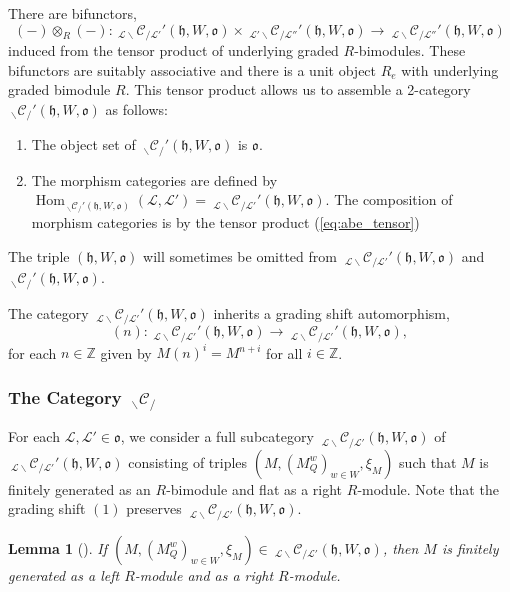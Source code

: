 \documentclass{amsart}
\newcommand{\Z}{\mathbb{Z}}
\newcommand{\scrL}{\mathcal{L}}
\DeclareMathOperator{\Hom}{Hom}
\newcommand{\fr}[1]{\mathfrak{#1}}
\newcommand{\Cmon}[2]{\:_{#1 \backslash} \mathcal{C}_{/ #2} }
\newtheorem{lemma}[subsubsection]{Lemma}
\theoremstyle{definition}
\numberwithin{equation}{subsection}
\begin{document}
There are bifunctors,
\begin{equation}\label{eq:abe_tensor}
    (-) \otimes_R (-) : \Cmon{\scrL}{\scrL'}' (\fr{h}, W, \fr{o}) \times \Cmon{\scrL'}{\scrL''}' (\fr{h}, W, \fr{o}) \to \Cmon{\scrL}{\scrL''}' (\fr{h}, W, \fr{o})
\end{equation}
induced from the tensor product of underlying graded $R$-bimodules. These bifunctors are suitably associative and there is a unit object $R_e$ with underlying graded bimodule $R$.
This tensor product allows us to assemble a 2-category $\Cmon{}{}' (\fr{h}, W, \fr{o})$ as follows:
\begin{enumerate} 
    \item The object set of $\Cmon{}{}' (\fr{h}, W, \fr{o})$ is $\fr{o}$. 
    \item The morphism categories are defined by $\Hom_{\Cmon{}{}' (\fr{h}, W, \fr{o})} (\scrL, \scrL') = \Cmon{\scrL}{\scrL'}' (\fr{h}, W, \fr{o})$. The composition of morphism categories is by the tensor product (\ref{eq:abe_tensor})
\end{enumerate}
The triple $(\fr{h}, W, \fr{o})$ will sometimes be omitted from $\Cmon{\scrL}{\scrL'}' (\fr{h}, W, \fr{o})$ and $\Cmon{}{}' (\fr{h}, W, \fr{o})$.

The category $\Cmon{\scrL}{\scrL'}' (\fr{h}, W, \fr{o})$ inherits a grading shift automorphism, 
\[ (n) : \Cmon{\scrL}{\scrL'}' (\fr{h}, W, \fr{o}) \to \Cmon{\scrL}{\scrL'}' (\fr{h}, W, \fr{o}), \] 
for each $n \in \Z$ given by $M(n)^i = M^{n+i}$ for all $i \in \Z$. 

\subsubsection{The Category \texorpdfstring{$\Cmon{}{}$}{C}}

For each $\scrL, \scrL' \in \fr{o}$, we consider a full subcategory $\Cmon{\scrL}{\scrL'} (\fr{h}, W, \fr{o})$ of $\Cmon{\scrL}{\scrL'}' (\fr{h}, W, \fr{o})$ consisting of triples $(M, (M_Q^w)_{w \in W}, \xi_M)$
such that $M$ is finitely generated as an $R$-bimodule and flat as a right $R$-module. Note that the grading shift $(1)$ preserves $\Cmon{\scrL}{\scrL'} (\fr{h}, W, \fr{o})$. 

\begin{lemma}[{\cite[Lemma 2.6]{Abe19}}]\label{lem:fg_of_left_and_right_modules}
    If $(M, (M_Q^w)_{w \in W}, \xi_M) \in \Cmon{\scrL}{\scrL'} (\fr{h}, W, \fr{o})$, then $M$ is finitely generated as a left $R$-module and as a right $R$-module.
\end{lemma}
\end{document}
